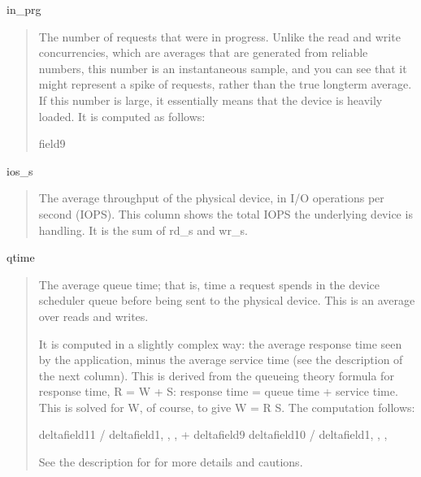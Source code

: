 \documentclass[letterpaper,10pt,english]{sphinxmanual}
\begin{document}
in\_prg
\begin{quote}

The number of requests that were in progress.  Unlike the read and write
concurrencies, which are averages that are generated from reliable numbers, this
number is an instantaneous sample, and you can see that it might represent a
spike of requests, rather than the true long\sphinxhyphen{}term average.  If this number is
large, it essentially means that the device is heavily loaded.  It is computed
as follows:

\begin{sphinxVerbatim}[commandchars=\\\{\}]
field9
\end{sphinxVerbatim}
\end{quote}

ios\_s
\begin{quote}

The average throughput of the physical device, in I/O operations per second
(IOPS).  This column shows the total IOPS the underlying device is handling.  It
is the sum of rd\_s and wr\_s.
\end{quote}

qtime
\begin{quote}

The average queue time; that is, time a request spends in the device scheduler
queue before being sent to the physical device.  This is an average over reads
and writes.

It is computed in a slightly complex way: the average response time seen by the
application, minus the average service time (see the description of the next
column).  This is derived from the queueing theory formula for response time, R
= W + S: response time = queue time + service time.  This is solved for W, of
course, to give W = R \sphinxhyphen{} S.  The computation follows:

\begin{sphinxVerbatim}[commandchars=\\\{\}]
delta\PYG{o}{[}field11\PYG{o}{]} / delta\PYG{o}{[}field1, , , \PYG{o}{]} + delta\PYG{o}{[}field9\PYG{o}{]}
   \PYGZhy{} delta\PYG{o}{[}field10\PYG{o}{]} / delta\PYG{o}{[}field1, , , \PYG{o}{]}
\end{sphinxVerbatim}

See the description for  for more details and cautions.
\end{quote}
\end{document}
